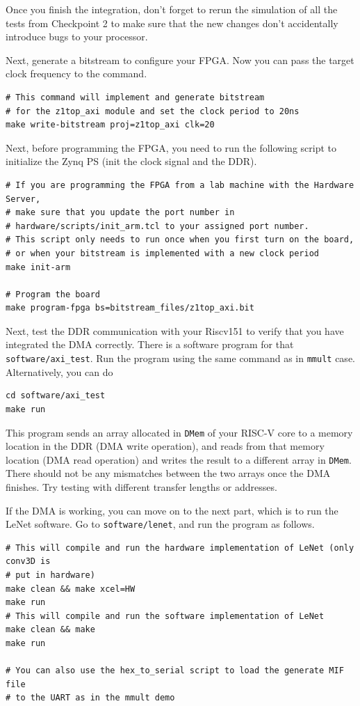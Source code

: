 \documentclass[11pt]{article}
\begin{document}
Once you finish the integration, don't forget to rerun the simulation of all the tests from Checkpoint 2 to make sure that the new changes don't accidentally introduce bugs to your processor.

Next, generate a bitstream to configure your FPGA. Now you can pass the target clock frequency to the command.

\begin{verbatim}
# This command will implement and generate bitstream
# for the z1top_axi module and set the clock period to 20ns
make write-bitstream proj=z1top_axi clk=20
\end{verbatim}

Next, before programming the FPGA, you need to run the following script to initialize the Zynq PS (init the clock signal and the DDR).

\begin{verbatim}
# If you are programming the FPGA from a lab machine with the Hardware Server,
# make sure that you update the port number in
# hardware/scripts/init_arm.tcl to your assigned port number.
# This script only needs to run once when you first turn on the board,
# or when your bitstream is implemented with a new clock period
make init-arm

# Program the board
make program-fpga bs=bitstream_files/z1top_axi.bit
\end{verbatim}

Next, test the DDR communication with your Riscv151 to verify that you have integrated the DMA correctly. There is a software program for that \verb|software/axi_test|. Run the program using the same command as in \texttt{mmult} case. Alternatively, you can do

\begin{verbatim}
cd software/axi_test
make run
\end{verbatim}

This program sends an array allocated in \texttt{DMem} of your RISC-V core to a memory location in the DDR (DMA write operation), and reads from that memory location (DMA read operation) and writes the result to a different array in \texttt{DMem}. There should not be any mismatches between the two arrays once the DMA finishes. Try testing with different transfer lengths or addresses.

If the DMA is working, you can move on to the next part, which is to run the LeNet software. Go to \verb|software/lenet|, and run the program as follows.

\begin{verbatim}
# This will compile and run the hardware implementation of LeNet (only conv3D is
# put in hardware)
make clean && make xcel=HW
make run
# This will compile and run the software implementation of LeNet
make clean && make
make run

# You can also use the hex_to_serial script to load the generate MIF file
# to the UART as in the mmult demo
\end{verbatim}
\end{document}
